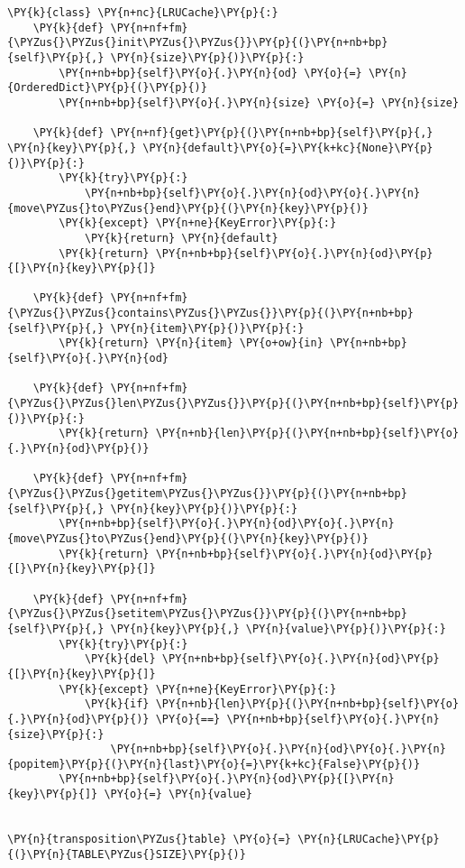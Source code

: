     \begin{tcolorbox}[fontupper=\linespread{.66}\selectfont, breakable, size=fbox, boxrule=1pt, pad at break*=1mm,colback=cellbackground, colframe=cellborder]
\begin{Verbatim}[commandchars=\\\{\}]
\PY{k}{class} \PY{n+nc}{LRUCache}\PY{p}{:}
    \PY{k}{def} \PY{n+nf+fm}{\PYZus{}\PYZus{}init\PYZus{}\PYZus{}}\PY{p}{(}\PY{n+nb+bp}{self}\PY{p}{,} \PY{n}{size}\PY{p}{)}\PY{p}{:}
        \PY{n+nb+bp}{self}\PY{o}{.}\PY{n}{od} \PY{o}{=} \PY{n}{OrderedDict}\PY{p}{(}\PY{p}{)}
        \PY{n+nb+bp}{self}\PY{o}{.}\PY{n}{size} \PY{o}{=} \PY{n}{size}

    \PY{k}{def} \PY{n+nf}{get}\PY{p}{(}\PY{n+nb+bp}{self}\PY{p}{,} \PY{n}{key}\PY{p}{,} \PY{n}{default}\PY{o}{=}\PY{k+kc}{None}\PY{p}{)}\PY{p}{:}
        \PY{k}{try}\PY{p}{:}
            \PY{n+nb+bp}{self}\PY{o}{.}\PY{n}{od}\PY{o}{.}\PY{n}{move\PYZus{}to\PYZus{}end}\PY{p}{(}\PY{n}{key}\PY{p}{)}
        \PY{k}{except} \PY{n+ne}{KeyError}\PY{p}{:}
            \PY{k}{return} \PY{n}{default}
        \PY{k}{return} \PY{n+nb+bp}{self}\PY{o}{.}\PY{n}{od}\PY{p}{[}\PY{n}{key}\PY{p}{]}

    \PY{k}{def} \PY{n+nf+fm}{\PYZus{}\PYZus{}contains\PYZus{}\PYZus{}}\PY{p}{(}\PY{n+nb+bp}{self}\PY{p}{,} \PY{n}{item}\PY{p}{)}\PY{p}{:}
        \PY{k}{return} \PY{n}{item} \PY{o+ow}{in} \PY{n+nb+bp}{self}\PY{o}{.}\PY{n}{od}

    \PY{k}{def} \PY{n+nf+fm}{\PYZus{}\PYZus{}len\PYZus{}\PYZus{}}\PY{p}{(}\PY{n+nb+bp}{self}\PY{p}{)}\PY{p}{:}
        \PY{k}{return} \PY{n+nb}{len}\PY{p}{(}\PY{n+nb+bp}{self}\PY{o}{.}\PY{n}{od}\PY{p}{)}

    \PY{k}{def} \PY{n+nf+fm}{\PYZus{}\PYZus{}getitem\PYZus{}\PYZus{}}\PY{p}{(}\PY{n+nb+bp}{self}\PY{p}{,} \PY{n}{key}\PY{p}{)}\PY{p}{:}
        \PY{n+nb+bp}{self}\PY{o}{.}\PY{n}{od}\PY{o}{.}\PY{n}{move\PYZus{}to\PYZus{}end}\PY{p}{(}\PY{n}{key}\PY{p}{)}
        \PY{k}{return} \PY{n+nb+bp}{self}\PY{o}{.}\PY{n}{od}\PY{p}{[}\PY{n}{key}\PY{p}{]}

    \PY{k}{def} \PY{n+nf+fm}{\PYZus{}\PYZus{}setitem\PYZus{}\PYZus{}}\PY{p}{(}\PY{n+nb+bp}{self}\PY{p}{,} \PY{n}{key}\PY{p}{,} \PY{n}{value}\PY{p}{)}\PY{p}{:}
        \PY{k}{try}\PY{p}{:}
            \PY{k}{del} \PY{n+nb+bp}{self}\PY{o}{.}\PY{n}{od}\PY{p}{[}\PY{n}{key}\PY{p}{]}
        \PY{k}{except} \PY{n+ne}{KeyError}\PY{p}{:}
            \PY{k}{if} \PY{n+nb}{len}\PY{p}{(}\PY{n+nb+bp}{self}\PY{o}{.}\PY{n}{od}\PY{p}{)} \PY{o}{==} \PY{n+nb+bp}{self}\PY{o}{.}\PY{n}{size}\PY{p}{:}
                \PY{n+nb+bp}{self}\PY{o}{.}\PY{n}{od}\PY{o}{.}\PY{n}{popitem}\PY{p}{(}\PY{n}{last}\PY{o}{=}\PY{k+kc}{False}\PY{p}{)}
        \PY{n+nb+bp}{self}\PY{o}{.}\PY{n}{od}\PY{p}{[}\PY{n}{key}\PY{p}{]} \PY{o}{=} \PY{n}{value}


\PY{n}{transposition\PYZus{}table} \PY{o}{=} \PY{n}{LRUCache}\PY{p}{(}\PY{n}{TABLE\PYZus{}SIZE}\PY{p}{)}
\end{Verbatim}
\end{tcolorbox}

